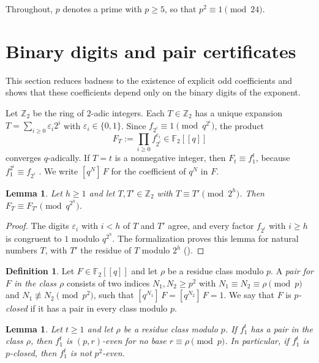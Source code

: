 \documentclass[12pt]{amsart}
\newtheorem{lemma}[theorem]{Lemma}
\theoremstyle{definition}
\newtheorem{definition}[theorem]{Definition}
\newcommand{\F}{\mathbb{F}_2}
\newcommand{\Zt}{\mathbb{Z}_2}
\newcommand{\coef}[2]{[q^{#1}]\,#2}
\newcommand{\lean}[1]{\ignorespaces}
\begin{document}
Throughout, $p$ denotes a prime with $p\ge5$, so that $p^2\equiv1\pmod{24}$.

\section{Binary digits and pair certificates}\label{sec:digits}

This section reduces badness to the existence of explicit odd coefficients and shows that these coefficients depend only on the binary digits of the exponent.

Let $\Zt$ be the ring of $2$-adic integers. Each $T\in\Zt$ has a unique expansion $T=\sum_{i\ge0}\varepsilon_i2^i$ with $\varepsilon_i\in\{0,1\}$. Since $f_{2^i}\equiv1\pmod{q^{2^i}}$, the product
\[
F_T:=\prod_{i\ge0}f_{2^i}^{\varepsilon_i}\in\F[[q]]
\]
converges $q$-adically. If $T=t$ is a nonnegative integer, then $F_t\equiv f_1^t$, because $f_1^{2^i}\equiv f_{2^i}$ \cite[Section~1.2]{KZ3}. We write $\coef{N}{F}$ for the coefficient of $q^N$ in $F$.

\begin{lemma}\label{lem:digits}
\lean{\decl{KeithZanello.coeff_fbar_pow_mod}, for natural numbers $T$, with $T'$ the residue of $T$ modulo $2^h$}
Let $h\ge1$ and let $T,T'\in\Zt$ with $T\equiv T'\pmod{2^h}$. Then $F_T\equiv F_{T'}\pmod{q^{2^h}}$.
\end{lemma}

\begin{proof}
The digits $\varepsilon_i$ with $i<h$ of $T$ and $T'$ agree, and every factor $f_{2^i}$ with $i\ge h$ is congruent to $1$ modulo $q^{2^h}$. The formalization proves this lemma for natural numbers $T$, with $T'$ the residue of $T$ modulo $2^h$ ().
\end{proof}

\begin{definition}\label{def:pair}
\lean{\decl{KeithZanello.IsPair}, \decl{KeithZanello.HasPair} and \decl{KeithZanello.Closed}, at $p=73$}
Let $F\in\F[[q]]$ and let $\rho$ be a residue class modulo $p$. A \emph{pair for $F$ in the class $\rho$} consists of two indices $N_1,N_2\ge p^2$ with $N_1\equiv N_2\equiv\rho\pmod p$ and $N_1\not\equiv N_2\pmod{p^2}$, such that $\coef{N_1}{F}=\coef{N_2}{F}=1$. We say that $F$ is \emph{$p$-closed} if it has a pair in every class modulo $p$.
\end{definition}

\begin{lemma}\label{lem:pairs}
\lean{\decl{KeithZanello.not_evenWithBase_of_hasPair}, at $p=73$; the second assertion is \decl{KeithZanello.not_isP2Even_of_closed}}
Let $t\ge1$ and let $\rho$ be a residue class modulo $p$. If $f_1^t$ has a pair in the class $\rho$, then $f_1^t$ is $(p,r)$-even for no base $r\equiv\rho\pmod p$. In particular, if $f_1^t$ is $p$-closed, then $f_1^t$ is not $p^2$-even.
\end{lemma}
\end{document}
